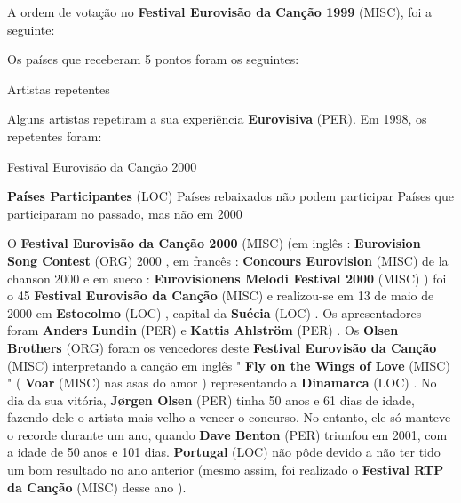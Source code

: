 \documentclass[12pt,a4paper]{article}
\begin{document}
A ordem de votação no \textbf{Festival Eurovisão da Canção 1999} (MISC), foi a seguinte:

Os países que receberam 5 pontos foram os seguintes:



Artistas repetentes

Alguns artistas repetiram a sua experiência \textbf{Eurovisiva} (PER). Em 1998, os repetentes foram:



Festival Eurovisão da Canção 2000



\textbf{Países Participantes} (LOC) Países rebaixados não podem participar Países que participaram no passado, mas não em 2000

O \textbf{Festival Eurovisão da Canção 2000} (MISC) (em inglês : \textbf{Eurovision Song Contest} (ORG) 2000 , em francês : \textbf{Concours Eurovision} (MISC) de la chanson 2000 e em sueco : \textbf{Eurovisionens Melodi Festival 2000} (MISC) ) foi o 45 \textbf{Festival Eurovisão da Canção} (MISC) e realizou-se em 13 de maio de 2000 em \textbf{Estocolmo} (LOC) , capital da \textbf{Suécia} (LOC) . Os apresentadores foram \textbf{Anders Lundin} (PER) e \textbf{Kattis Ahlström} (PER) . Os \textbf{Olsen Brothers} (ORG) foram os vencedores deste \textbf{Festival Eurovisão da Canção} (MISC) interpretando a canção em inglês " \textbf{Fly on the Wings of Love} (MISC) " ( \textbf{Voar} (MISC) nas asas do amor ) representando a \textbf{Dinamarca} (LOC) . No dia da sua vitória, \textbf{Jørgen Olsen} (PER) tinha 50 anos e 61 dias de idade, fazendo dele o artista mais velho a vencer o concurso. No entanto, ele só manteve o recorde durante um ano, quando \textbf{Dave Benton} (PER) triunfou em 2001, com a idade de 50 anos e 101 dias. \textbf{Portugal} (LOC) não pôde devido a não ter tido um bom resultado no ano anterior (mesmo assim, foi realizado o \textbf{Festival RTP da Canção} (MISC) desse ano ).
\end{document}
